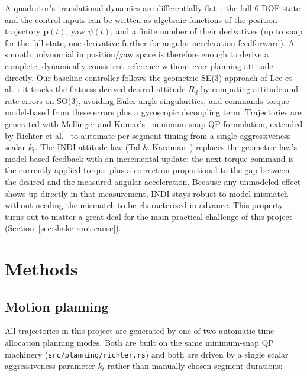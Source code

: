 \documentclass[11pt,a4paper]{article}
\newcommand{\code}[1]{\texttt{#1}}
\begin{document}
A quadrotor's translational dynamics are differentially flat~\cite{mellinger2011}: the full 6-DOF
state and the control inputs can be written as algebraic functions of the position trajectory
$\mathbf{p}(t)$, yaw $\psi(t)$, and a finite number of their derivatives (up to snap for the full
state, one derivative further for angular-acceleration feedforward). A smooth polynomial in
position/yaw space is therefore enough to derive a complete, dynamically consistent reference
without ever planning attitude directly. Our baseline controller follows the geometric SE(3)
approach of Lee et al.~\cite{lee2010}: it tracks the flatness-derived desired attitude $R_d$ by
computing attitude and rate errors on SO(3), avoiding Euler-angle singularities, and commands
torque model-based from these errors plus a gyroscopic decoupling term. Trajectories are
generated with
Mellinger and Kumar's~\cite{mellinger2011} minimum-snap QP formulation, extended by Richter et
al.~\cite{richter2016} to automate per-segment timing from a single aggressiveness scalar $k_t$.
The INDI attitude law (Tal \& Karaman~\cite{tal2020}) replaces the geometric law's model-based
feedback with an incremental update: the next torque command is the currently applied torque plus
a correction proportional to the gap between the desired and the measured angular acceleration.
Because any unmodeled effect shows up directly in that measurement, INDI stays robust to model
mismatch without needing the mismatch to be characterized in advance. This property turns out to
matter a great deal for the main practical challenge of this project
(Section~\ref{sec:shake-root-cause}).

\section{Methods}

\subsection{Motion planning}
\label{sec:planning-methods}

All trajectories in this project are generated by one of two automatic-time-allocation planning
modes. Both are built on the same minimum-snap QP machinery (\code{src/planning/richter.rs}) and
both are driven by a single scalar aggressiveness parameter $k_t$ rather than manually chosen
segment durations:
\end{document}
